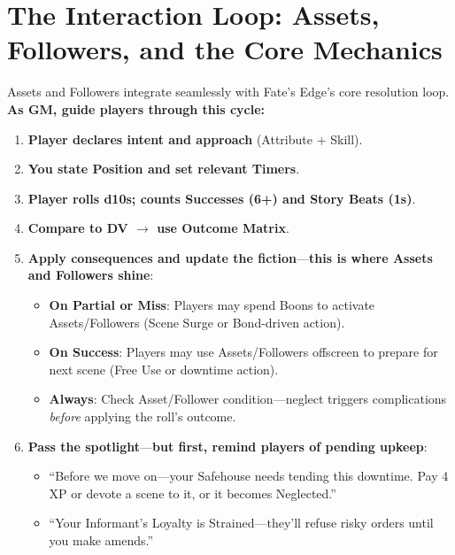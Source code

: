 \section{The Interaction Loop: Assets, Followers, and the Core Mechanics}
\label{sec:interaction-loop}
Assets and Followers integrate seamlessly with Fate's Edge's core resolution loop. \textbf{As GM, guide players through this cycle:}  

\begin{enumerate}
  \item \textbf{Player declares intent and approach} (Attribute + Skill).  
  \item \textbf{You state Position and set relevant Timers}.  
  \item \textbf{Player rolls d10s; counts Successes (6+) and Story Beats (1s)}.  
  \item \textbf{Compare to DV $\rightarrow$ use Outcome Matrix}.  
  \item \textbf{Apply consequences and update the fiction}---\textbf{this is where Assets and Followers shine}:  
        \begin{itemize}
          \item \textbf{On Partial or Miss}: Players may spend Boons to activate Assets/Followers (Scene Surge or Bond-driven action).  
          \item \textbf{On Success}: Players may use Assets/Followers offscreen to prepare for next scene (Free Use or downtime action).  
          \item \textbf{Always}: Check Asset/Follower condition---neglect triggers complications \emph{before} applying the roll's outcome.  
        \end{itemize}
  \item \textbf{Pass the spotlight}---\textbf{but first, remind players of pending upkeep}:  
        \begin{itemize}
          \item ``Before we move on---your Safehouse needs tending this downtime. Pay 4 XP or devote a scene to it, or it becomes Neglected.''  
          \item ``Your Informant's Loyalty is Strained---they'll refuse risky orders until you make amends.''  
        \end{itemize}
\end{enumerate}

